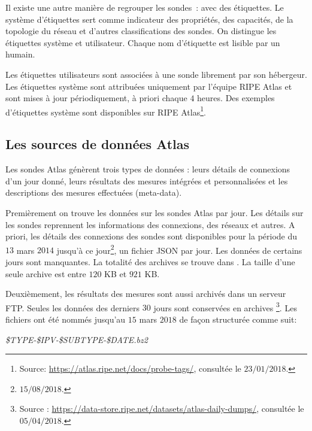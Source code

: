 Il existe une autre manière de regrouper les sondes~:  avec des étiquettes.  Le système d'étiquettes sert comme indicateur des propriétés, des capacités, de la topologie du réseau et d'autres classifications des sondes. On distingue les étiquettes système  et utilisateur. Chaque nom d'étiquette est lisible par un humain. 

Les étiquettes utilisateurs sont  associées à une sonde librement par son hébergeur. Les étiquettes système sont attribuées uniquement par l'équipe RIPE Atlas et sont mises à jour périodiquement, à priori chaque $4$ heures. Des exemples d'étiquettes système sont disponibles sur RIPE Atlas\footnote{Source: \url{https://atlas.ripe.net/docs/probe-tags/}, consultée le $23/01/2018$.}.


\subsection{Les sources de données Atlas} \label{subsec:sources-data}


Les sondes  Atlas génèrent trois types de données : leurs détails de connexions d'un jour donné, leurs résultats des mesures intégrées et personnalisées et les descriptions des mesures effectuées (meta-data). 

Premièrement on trouve les données sur les sondes  Atlas par jour. Les détails sur les sondes reprennent les informations des connexions, des réseaux et autres. A priori, les détails des connexions des sondes sont disponibles pour la période du  $13$ mars $2014$ jusqu'à ce jour\footnote{$15/08/2018$.}, un fichier JSON par jour.
Les données de certains jours sont manquantes.  La totalité des archives se trouve dans \cite{probes-data}. La taille d'une seule archive est entre $120 $ KB et $921$ KB. 

Deuxièmement, les résultats des mesures sont aussi archivés dans un serveur FTP. Seules les données des derniers $30$ jours  sont conservées en archives \footnote{Source : \url{https://data-store.ripe.net/datasets/atlas-daily-dumps/}, consultée le $05/04/2018$.}. Les fichiers ont été nommés jusqu'au  $ 15 $ mars $ 2018 $ de façon structurée comme suit: 

\begin{tcolorbox}
	\begin{center}
		\textit{\$TYPE-\$IPV-\$SUBTYPE-\$DATE.bz2}
	\end{center}
\end{tcolorbox}

